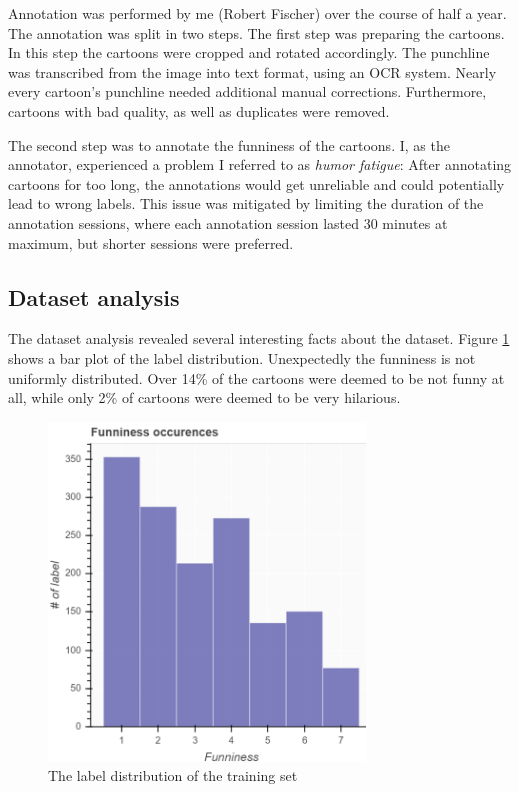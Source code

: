 \documentclass[draft,final,oneside]{vutinfth} %
\begin{document}
Annotation was performed by me (Robert Fischer) over the course of half a year. The annotation was split in two steps. The first step was preparing the cartoons. In this step the cartoons were cropped and rotated accordingly. The punchline was transcribed from the image into text format, using an OCR system. Nearly every cartoon's punchline needed additional manual corrections. Furthermore, cartoons with bad quality, as well as duplicates were removed.

The second step was to annotate the funniness of the cartoons. I, as the annotator, experienced a problem I referred to as \textit{humor fatigue}: After annotating cartoons for too long, the annotations would get unreliable and could potentially lead to wrong labels. This issue was mitigated by limiting the duration of the annotation sessions, where each annotation session lasted 30 minutes at maximum, but shorter sessions were preferred. 

\subsection{Dataset analysis}

The dataset analysis revealed several interesting facts about the dataset. Figure \ref{fig:labeldistr} shows a bar plot of the label distribution. Unexpectedly the funniness is not uniformly distributed. Over 14\% of the cartoons were deemed to be not funny at all, while only 2\% of cartoons were deemed to be very hilarious.

\begin{figure}
	\centering
  	\includegraphics[width=0.75\textwidth]{graphics/label_distribution.png}
	\caption{The label distribution of the training set}
	\label{fig:labeldistr}
\end{figure}
\end{document}
